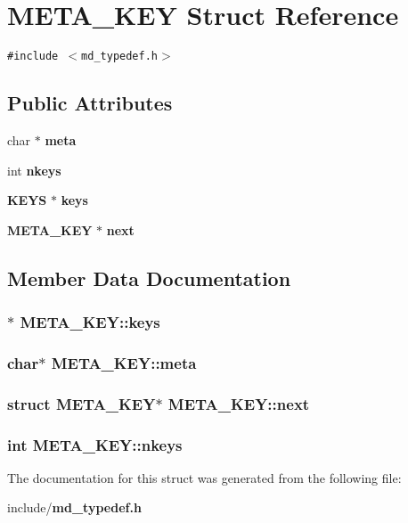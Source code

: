 \section{META\_\-KEY Struct Reference}
\label{structMETA__KEY}
{\tt \#include $<$md\_\-typedef.h$>$}

\subsection*{Public Attributes}
\begin{CompactItemize}
\item 
char $\ast$ {\bf meta}
\item 
int {\bf nkeys}
\item 
{\bf KEYS} $\ast$ {\bf keys}
\item 
{\bf META\_\-KEY} $\ast$ {\bf next}
\end{CompactItemize}


\subsection{Member Data Documentation}
\subsubsection{$\ast$ {\bf META\_\-KEY::keys}}\label{structMETA__KEY_b1c0c220d0320e142edefaf8244f6fa2}


\subsubsection{\setlength{\rightskip}{0pt plus 5cm}char$\ast$ {\bf META\_\-KEY::meta}}\label{structMETA__KEY_8d9d0c00f1e9b76d576536faeed18fbf}


\subsubsection{\setlength{\rightskip}{0pt plus 5cm}struct {\bf META\_\-KEY}$\ast$ {\bf META\_\-KEY::next}}\label{structMETA__KEY_5d9b3f781490150c0e3128c1a8621613}


\subsubsection{\setlength{\rightskip}{0pt plus 5cm}int {\bf META\_\-KEY::nkeys}}\label{structMETA__KEY_f7e282a5743f1c488f8e1d4eb9ce19d2}




The documentation for this struct was generated from the following file:\begin{CompactItemize}
\item 
include/{\bf md\_\-typedef.h}\end{CompactItemize}
